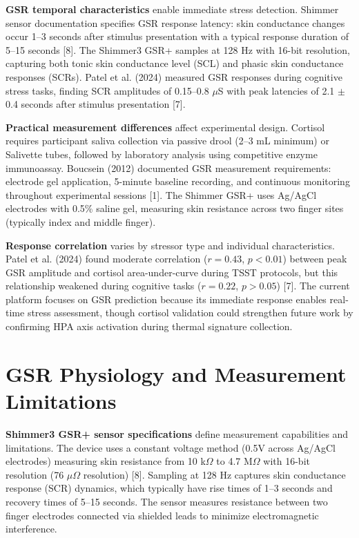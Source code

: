 \textbf{GSR temporal characteristics} enable immediate stress detection. Shimmer sensor documentation specifies GSR response latency: skin conductance changes occur 1--3 seconds after stimulus presentation with a typical response duration of 5--15 seconds [8]. The Shimmer3 GSR+ samples at 128 Hz with 16-bit resolution, capturing both tonic skin conductance level (SCL) and phasic skin conductance responses (SCRs). Patel et al. (2024) measured GSR responses during cognitive stress tasks, finding SCR amplitudes of 0.15--0.8 $\mu$S with peak latencies of 2.1 $\pm$ 0.4 seconds after stimulus presentation [7].

\textbf{Practical measurement differences} affect experimental design. Cortisol requires participant saliva collection via passive drool (2--3 mL minimum) or Salivette tubes, followed by laboratory analysis using competitive enzyme immunoassay. Boucsein (2012) documented GSR measurement requirements: electrode gel application, 5-minute baseline recording, and continuous monitoring throughout experimental sessions [1]. The Shimmer GSR+ uses Ag/AgCl electrodes with 0.5\% saline gel, measuring skin resistance across two finger sites (typically index and middle finger).

\textbf{Response correlation} varies by stressor type and individual characteristics. Patel et al. (2024) found moderate correlation ($r = 0.43$, $p < 0.01$) between peak GSR amplitude and cortisol area-under-curve during TSST protocols, but this relationship weakened during cognitive tasks ($r = 0.22$, $p > 0.05$) [7]. The current platform focuses on GSR prediction because its immediate response enables real-time stress assessment, though cortisol validation could strengthen future work by confirming HPA axis activation during thermal signature collection.

\section{GSR Physiology and Measurement Limitations}
\textbf{Shimmer3 GSR+ sensor specifications} define measurement capabilities and limitations. The device uses a constant voltage method (0.5V across Ag/AgCl electrodes) measuring skin resistance from 10 k$\Omega$ to 4.7 M$\Omega$ with 16-bit resolution (76 $\mu\Omega$ resolution) [8]. Sampling at 128 Hz captures skin conductance response (SCR) dynamics, which typically have rise times of 1--3 seconds and recovery times of 5--15 seconds. The sensor measures resistance between two finger electrodes connected via shielded leads to minimize electromagnetic interference.


